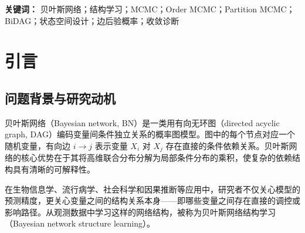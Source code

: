 \documentclass[UTF8,a4paper,12pt]{ctexart}
\begin{document}
\nkuMakeCover

\begin{abstract}
贝叶斯网络结构学习旨在从观测数据中推断变量之间的有向无环依赖关系。随着节点数增加，DAG 空间呈超指数增长，同时每个候选结构必须满足无环约束，使得精确结构学习在计算上面临较高复杂度。本文从算法设计动机出发，系统分析 Structure MCMC、Order MCMC 和 Partition MCMC 三类采样策略在状态空间构造、proposal 机制和混合效率方面的核心差异。在此基础上，本文加入三项扩展分析模块：自适应父节点集约束、边后验熵不确定性度量以及多链诊断框架。实验部分构建了从数据模拟、自主实现到 BiDAG 官方包复现的完整链路，并在低维和中等规模设置下进行比较，同时补充 iterative 策略的规模扩展实验。代码层面，实验框架通过 checkpoint 机制支持断点续跑与结果追踪。结果表明，Order MCMC 和 Partition MCMC 通过重构状态空间缓解了直接 DAG 搜索的混合困难；结合预筛选与迭代修正的 hybrid/iterative 策略可作为较大规模网络上的实用补充。边后验不确定性分析进一步揭示了不同方法在结构置信度量化方面的差异，为实际应用中的方法选择提供参考。
\end{abstract}

\noindent\textbf{关键词：} 贝叶斯网络；结构学习；MCMC；Order MCMC；Partition MCMC；BiDAG；状态空间设计；边后验概率；收敛诊断

\newpage
\tableofcontents
\newpage
{}

\section{引言}

\subsection{问题背景与研究动机}

贝叶斯网络（Bayesian network, BN）是一类用有向无环图（directed acyclic graph, DAG）编码变量间条件独立关系的概率图模型。图中的每个节点对应一个随机变量，有向边 $i \to j$ 表示变量 $X_i$ 对 $X_j$ 存在直接的条件依赖关系。贝叶斯网络的核心优势在于其将高维联合分布分解为局部条件分布的乘积，使复杂的依赖结构具有清晰的可解释性。

在生物信息学、流行病学、社会科学和因果推断等应用中，研究者不仅关心模型的预测精度，更关心变量之间的结构关系本身——即哪些变量之间存在直接的调控或影响路径。从观测数据中学习这样的网络结构，被称为贝叶斯网络结构学习（Bayesian network structure learning）\citep{heckerman1995learning}。
\end{document}

